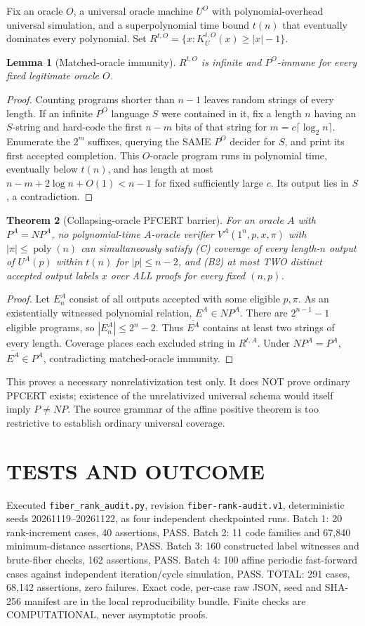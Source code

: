 \documentclass[11pt]{article}
\newtheorem{theorem}{Theorem}
\newtheorem{lemma}[theorem]{Lemma}
\begin{document}
Fix an oracle $O$, a universal oracle machine $U^O$ with polynomial-overhead universal simulation, and a superpolynomial time bound $t(n)$ that eventually dominates every polynomial. Set $R^{t,O}=\{x:K_{U}^{t,O}(x)\ge |x|-1\}$.
\begin{lemma}[Matched-oracle immunity]
$R^{t,O}$ is infinite and $P^O$-immune for every fixed legitimate oracle $O$.
\end{lemma}
\begin{proof} Counting programs shorter than $n-1$ leaves random strings of every length. If an infinite $P^O$ language $S$ were contained in it, fix a length $n$ having an $S$-string and hard-code the first $n-m$ bits of that string for $m=c\lceil\log_2 n\rceil$. Enumerate the $2^m$ suffixes, querying the SAME $P^O$ decider for $S$, and print its first accepted completion. This $O$-oracle program runs in polynomial time, eventually below $t(n)$, and has length at most $n-m+2\log n+O(1)<n-1$ for fixed sufficiently large $c$. Its output lies in $S$, a contradiction.
\end{proof}
\begin{theorem}[Collapsing-oracle PFCERT barrier]
For an oracle $A$ with $P^A=NP^A$, no polynomial-time $A$-oracle verifier $V^A(1^n,p,x,\pi)$ with $|\pi|\le\operatorname{poly}(n)$ can simultaneously satisfy (C) coverage of every length-$n$ output of $U^A(p)$ within $t(n)$ for $|p|\le n-2$, and (B2) at most TWO distinct accepted output labels $x$ over ALL proofs for every fixed $(n,p)$.
\end{theorem}
\begin{proof}
Let $E_n^A$ consist of all outputs accepted with some eligible $p,\pi$. As an existentially witnessed polynomial relation, $E^A\in NP^A$. There are $2^{n-1}-1$ eligible programs, so $|E_n^A|\le 2^n-2$. Thus $\overline{E^A}$ contains at least two strings of every length. Coverage places each excluded string in $R^{t,A}$. Under $NP^A=P^A$, $\overline{E^A}\in P^A$, contradicting matched-oracle immunity.
\end{proof}
This proves a necessary nonrelativization test only. It does NOT prove ordinary PFCERT exists; existence of the unrelativized universal schema would itself imply $P\ne NP$. The source grammar of the affine positive theorem is too restrictive to establish ordinary universal coverage.

\section{TESTS AND OUTCOME}
Executed \texttt{fiber\_rank\_audit.py}, revision \texttt{fiber-rank-audit.v1}, deterministic seeds 20261119--20261122, as four independent checkpointed runs. Batch 1: 20 rank-increment cases, 40 assertions, PASS. Batch 2: 11 code families and 67,840 minimum-distance assertions, PASS. Batch 3: 160 constructed label witnesses and brute-fiber checks, 162 assertions, PASS. Batch 4: 100 affine periodic fast-forward cases against independent iteration/cycle simulation, PASS. TOTAL: 291 cases, 68,142 assertions, zero failures. Exact code, per-case raw JSON, seed and SHA-256 manifest are in the local reproducibility bundle. Finite checks are COMPUTATIONAL, never asymptotic proofs.
\end{document}
